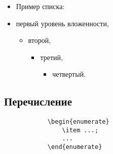 \documentclass[14pt, a4paper, titlepage]{extarticle}
\begin{document}
            \begin{itemize}
                \item[] Пример списка:
                \item первый уровень вложенности,
                \begin{itemize}
                    \item второй,
                    \begin{itemize}
                        \item третий,
                        \begin{itemize}
                            \item четвертый.
                        \end{itemize}
                    \end{itemize}
                \end{itemize}
            \end{itemize}

        \subsection{Перечисление}
            \begin{verbatim}
            \begin{enumerate}
                \item ...;
                ...
            \end{enumerate} 
            \end{verbatim}
\end{document}
